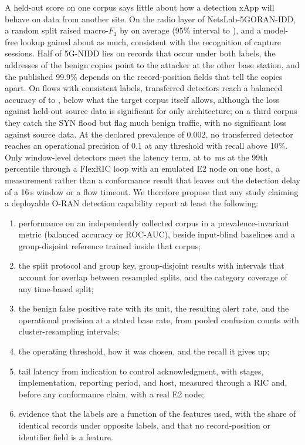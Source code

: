 \documentclass{ieeeaccess}
\begin{document}
A held-out score on one corpus says little about how a detection xApp will behave on data from another site. On the radio layer of NetsLab-5GORAN-IDD, a random split raised macro-$F_1$ by \LeakAvg{} on average (95\% interval \LeakAvgNbLo{} to \LeakAvgNbHi{}), and a model-free lookup gained about as much, consistent with the recognition of capture sessions. Half of 5G-NIDD lies on records that occur under both labels, the addresses of the benign copies point to the attacker at the other base station, and the published 99.9\% depends on the record-position fields that tell the copies apart. On flows with consistent labels, transferred detectors reach a balanced accuracy of \TrCleanTgtBAmin{} to \TrCleanTgtBAmax{}, below what the target corpus itself allows, although the loss against held-out source data is significant for only \TrCleanSig{} architecture; on a third corpus they catch the SYN flood but flag much benign traffic, with no significant loss against source data. At the declared prevalence of 0.002, no transferred detector reaches an operational precision of 0.1 at any threshold with recall above 10\%. Only window-level detectors meet the latency term, at \RicLoopTenPnnMin{} to \RicLoopTenPnnMax{}\,ms at the 99th percentile through a FlexRIC loop with an emulated E2 node on one host, a measurement rather than a conformance result that leaves out the detection delay of a 16\,s window or a flow timeout. We therefore propose that any study claiming a deployable O-RAN detection capability report at least the following:
\begin{enumerate}
\item performance on an independently collected corpus in a prevalence-invariant metric (balanced accuracy or ROC-AUC), beside input-blind baselines and a group-disjoint reference trained inside that corpus;
\item the split protocol and group key, group-disjoint results with intervals that account for overlap between resampled splits, and the category coverage of any time-based split;
\item the benign false positive rate with its unit, the resulting alert rate, and the operational precision at a stated base rate, from pooled confusion counts with cluster-resampling intervals;
\item the operating threshold, how it was chosen, and the recall it gives up;
\item tail latency from indication to control acknowledgment, with stages, implementation, reporting period, and host, measured through a RIC and, before any conformance claim, with a real E2 node;
\item evidence that the labels are a function of the features used, with the share of identical records under opposite labels, and that no record-position or identifier field is a feature.
\end{enumerate}
\end{document}
